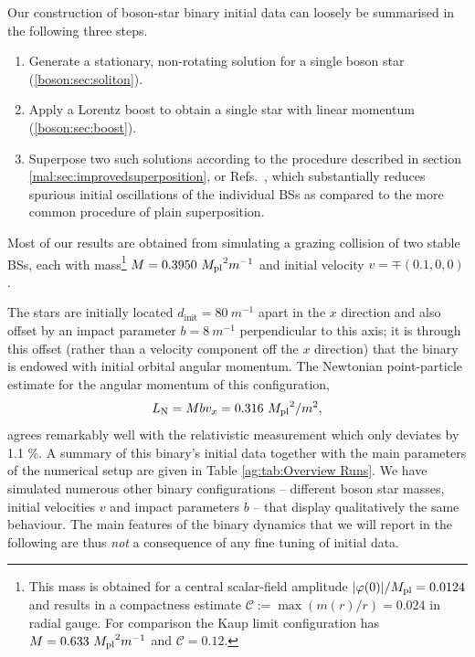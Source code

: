 Our construction of boson-star binary initial data can loosely
be summarised in the following three steps.
\begin{enumerate}
    \item Generate a stationary, non-rotating solution for a single boson star (\ref{boson:sec:soliton}).
    \item Apply a Lorentz boost to obtain a single star with linear momentum (\ref{boson:sec:boost}).
    \item Superpose two such solutions
    according to the procedure described in section \ref{mal:sec:improvedsuperposition}, or
    Refs.~\cite{Helfer:2018vtq,Helfer:2021brt}, which
    substantially reduces spurious initial oscillations of the
    individual BSs as compared to the more common procedure
    of plain superposition.
\end{enumerate}

Most of our results are obtained from
simulating a grazing collision of two stable BSs, each with mass\footnote{This mass is obtained for a central scalar-field amplitude $|\varphi(0)|/{M_{\rm pl}} =0.0124$ and results in a compactness estimate
$\mathcal{C} := \max (m(r)/r) = 0.024$ in radial gauge.
For comparison the Kaup limit configuration has
$M=0.633~{M_{\rm pl}}^2 m^{-1}$ and $\mathcal{C} = 0.12$.}  $M = 0.3950
~{M_{\rm pl}}^2 m^{-1}$ and
initial velocity $v = \mp(0.1,0,0)$.



%
The stars are initially located $d_{\text{init}} = 80~m^{-1}$
apart in the $x$ direction and also offset by an impact parameter
$b=8~m^{-1}$ perpendicular to this axis; it is through this offset
(rather than a velocity component off the $x$ direction) that
the binary is endowed with initial orbital angular momentum.
The Newtonian point-particle estimate for the angular momentum
of this configuration,
%
\begin{equation}
    L_{ \rm N} =  M b v_x = 0.316~{M_{\rm pl}}^2/m^2,
\end{equation}
%
agrees remarkably well with the relativistic measurement which only deviates by 1.1 \%.
A summary of this binary's initial data together with the main parameters of the numerical setup are given in Table \ref{ag:tab:Overview Runs}. We have simulated numerous other
binary configurations -- different boson star masses, initial velocities $v$ and impact parameters $b$ -- that display qualitatively
the same behaviour. The main features of the binary dynamics
that we will report in the following are thus {\it not} a
consequence of any fine tuning of initial data.


